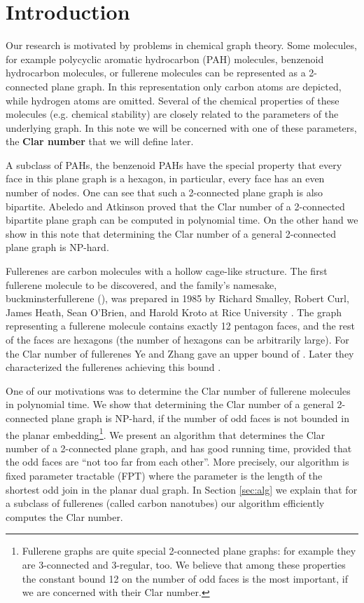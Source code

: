 \documentclass{article}
\begin{document}
\section{Introduction} 


Our research is motivated by problems in chemical graph theory. Some
molecules, for example polycyclic aromatic hydrocarbon (PAH) molecules,
benzenoid hydrocarbon molecules, or fullerene molecules can be
represented as a 2-connected plane graph. In this representation only carbon atoms are depicted, while hydrogen atoms are omitted. 
Several of the chemical properties of these molecules (e.g. chemical stability) are closely related to the parameters of the underlying graph. In this note we will be concerned with one of these parameters, the \textbf{Clar number} that we will define later.


A subclass of PAHs, the benzenoid PAHs have the special property that every
face in this plane graph is a hexagon, in particular, every face has an even
number of nodes. One can see that such a 2-connected plane graph is
also bipartite. Abeledo and Atkinson proved that the Clar number of a
2-connected bipartite plane graph can be computed in polynomial
time. On the other hand we show in this note that determining the Clar
number of a general 2-connected plane graph is NP-hard.

Fullerenes are carbon molecules with a hollow cage-like structure.
The first fullerene molecule to be discovered, and the family's
namesake, buckminsterfullerene (), was prepared in 1985 by
Richard Smalley, Robert Curl, James Heath, Sean O'Brien, and Harold
Kroto at Rice University \cite{kroto1985c}. The graph representing a fullerene molecule
contains exactly 12 pentagon faces, and the rest of the faces are
hexagons (the number of hexagons can be arbitrarily large). 
For the Clar number of fullerenes Ye and Zhang gave an upper bound of  \cite{zhang2007upper}.
Later they characterized the fullerenes achieving this bound \cite{ye2009extremal}.


One of our
motivations was to determine the Clar number of fullerene molecules in
polynomial time. 
We show that
determining the Clar number of a general 2-connected plane graph is
NP-hard, if the number of odd faces is not bounded in the planar
embedding\footnote{Fullerene graphs are quite special 2-connected plane graphs: for example they are 3-connected and  3-regular, too. We believe that among these properties the constant bound 12 on the number of odd faces is the most important, if we are concerned with their Clar number.}. 
We present an algorithm that determines the Clar number of a
2-connected plane graph, and has good running time, provided that the
odd faces are ``not too far from each other''. More precisely, our
algorithm is fixed parameter tractable (FPT) where the parameter is
the length of the shortest odd join in the planar dual graph. In
Section \ref{sec:alg} we explain that for a subclass of fullerenes
(called carbon nanotubes) our algorithm efficiently computes the Clar
number.
\end{document}

